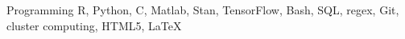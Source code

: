 

\begin{cvskills}

  \cvskill
    {Programming} %
    {R, Python, C, Matlab, Stan, TensorFlow, Bash, SQL, regex, Git, cluster computing, HTML5, \LaTeX} %

\end{cvskills}
